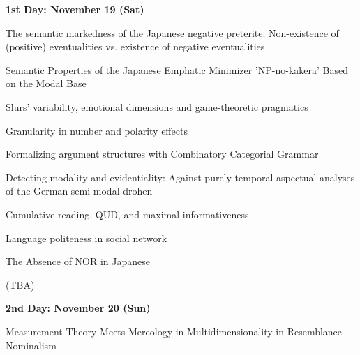 \documentclass[12pt]{jarticle}
\begin{document}
\noindent\textbf{\large 
1st Day: November 19 (Sat)
}\\






 
  
      {The semantic markedness of the Japanese negative preterite: Non-existence of (positive) eventualities vs. existence of negative eventualities}
      {}
  
      {Semantic Properties of the Japanese Emphatic Minimizer 'NP-no-kakera' Based on the Modal Base}
      {}
  
      {Slurs' variability, emotional dimensions and game-theoretic pragmatics}
      {}



 
  
      {Granularity in number and polarity effects}
      {}
  
      {Formalizing argument structures with Combinatory Categorial Grammar}
      {}
  
      {Detecting modality and evidentiality: Against purely temporal-aspectual analyses of the German semi-modal drohen}
      {}



 
  
      {Cumulative reading, QUD, and maximal informativeness}
      {}
  
      {Language politeness in social network}
      {}
  
      {The Absence of NOR in Japanese}
      {}




  
      {(TBA)}
      {}




\noindent\textbf{\large 
2nd Day: November 20 (Sun)
}\\




  
      {Measurement Theory Meets Mereology in Multidimensionality in Resemblance Nominalism}
      {}
  
\end{document}
